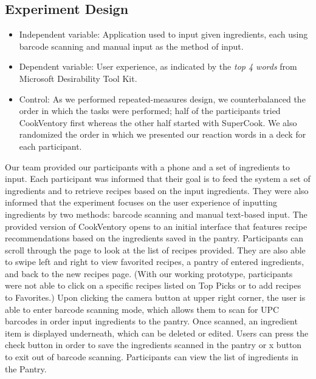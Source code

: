 \documentclass{sigchi}
\begin{document}
\subsection{Experiment Design}
\begin{itemize}
	\item Independent variable: Application used to input given ingredients, each using barcode scanning and manual input as the method of input.
	\item Dependent variable: User experience, as indicated by the \textit{top 4 words} from Microsoft Desirability Tool Kit.
	\item Control: As we performed repeated-measures design, we counterbalanced the order in which the tasks were performed; half of the participants tried CookVentory first whereas the other half started with SuperCook. We also randomized the order in which we presented our reaction words in a deck for each participant. \\
\end{itemize}
	 Our team provided our participants with a phone and a set of ingredients to input. Each participant was informed that their goal is to feed the system a set of ingredients and to retrieve recipes based on the input ingredients. They were also informed that the experiment focuses on the user experience of inputting ingredients by two methods: barcode scanning and manual text-based input.
	 The provided version of CookVentory opens to an initial interface that features recipe recommendations based on the ingredients saved in the pantry. Participants can scroll through the page to look at the list of recipes provided. They are also able to swipe left and right to view favorited recipes, a pantry of entered ingredients, and back to the new recipes page. (With our working prototype, participants were not able to click on a specific recipes listed on Top Picks or to add recipes to Favorites.) Upon clicking the camera button at upper right corner, the user is able to enter barcode scanning mode, which allows them to scan for UPC barcodes in order input ingredients to the pantry. Once scanned, an ingredient item is displayed underneath, which can be deleted or edited. Users can press the check button in order to save the ingredients scanned in the pantry or x button to exit out of barcode scanning. Participants can view the list of ingredients in the Pantry. \\~\\
\end{document}

